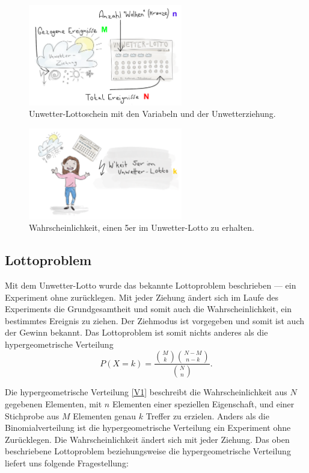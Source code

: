 \begin{refsection}
\begin{figure}
\centering
\includegraphics[width=0.6\textwidth]{extrem/Lottoscheinausgefuellt.pdf}
\caption{Unwetter-Lottoschein mit den Variabeln und der Unwetterziehung.}
\label{ErklaerungLotto}
\end{figure}

\begin{figure}
\centering
\includegraphics[width=0.6\textwidth]{extrem/wkeitlotto.pdf}
\caption{Wahrscheinlichkeit, einen 5er im Unwetter-Lotto zu erhalten.}
\label{WahrscheinlichkeitUnwetter-Lotto}
\end{figure}


\subsection{Lottoproblem} \label{Lottoproblem}
Mit dem Unwetter-Lotto wurde das bekannte Lottoproblem beschrieben
--- ein Experiment ohne zurücklegen. Mit jeder Ziehung ändert sich
im Laufe des Experiments die Grundgesamtheit und somit auch die
Wahrscheinlichkeit, ein bestimmtes Ereignis zu ziehen. Der Ziehmodus
ist vorgegeben und somit ist auch der Gewinn bekannt. Das Lottoproblem
ist somit nichts anderes als die hypergeometrische Verteilung
\begin{equation}
P(X = k) = 
\frac{\displaystyle \binom{M}{k} \binom{N-M}{n-k}}{\displaystyle \binom{N}{n} }. 
\label {V1}
\end{equation}

Die hypergeometrische Verteilung \eqref{V1} beschreibt die Wahrscheinlichkeit aus $N$ gegebenen Elementen, mit $n$ Elementen einer speziellen Eigenschaft, und einer Stichprobe aus $M$ Elementen genau $k$ Treffer zu erzielen. 
Anders als die Binomialverteilung ist die hypergeometrische Verteilung ein Experiment ohne Zurücklegen. Die Wahrscheinlichkeit ändert sich mit jeder Ziehung. 
%
Das oben beschriebene Lottoproblem beziehungsweise die hypergeometrische
Verteilung liefert uns folgende Fragestellung:
%


\end{refsection}
